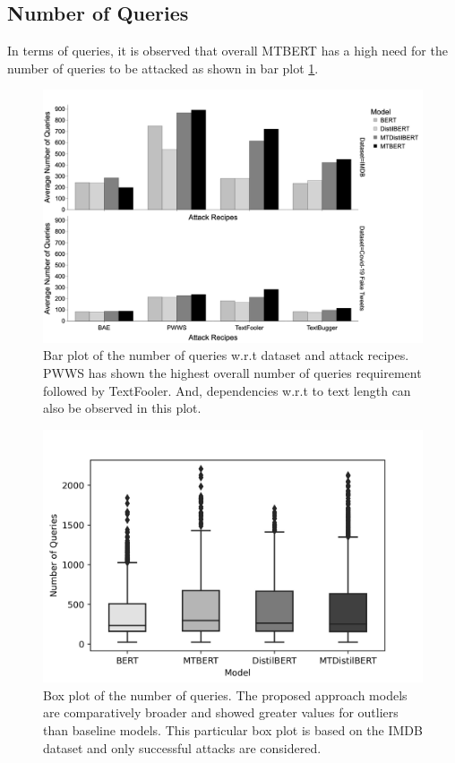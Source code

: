 \documentclass[%
	BCOR=8mm, %
	DIV=12,
	toc=bibliography, %
	toc=listof, %
	oneside, %
	egregdoesnotlikesansseriftitles, %
	]{scrbook}
\begin{document}
\subsection{Number of Queries}
In terms of queries, it is observed that overall MTBERT has a high need for the number of queries to be attacked as shown in bar plot \ref{fig:avgnquebyattackrecipes}.
\begin{figure}[H]
	\centering
    \includegraphics[width=.85\linewidth]{img/AvgNQuebyDataset}
	\caption[Bar plot of the number of queries]{Bar plot of the number of queries w.r.t dataset and attack recipes. PWWS has shown the highest overall number of queries requirement followed by TextFooler.  And, dependencies w.r.t to text length can also be observed in this plot.}
	\label{fig:avgnquebyattackrecipes}
\end{figure}
\begin{figure}[H]
    \centering
    \includegraphics[width=0.70\linewidth]{img/NumQueriesDist_box_IMDB.png}
    \caption[Box plot of the number of queries.]{ Box plot of the number of queries. The proposed approach models are comparatively broader and showed greater values for outliers than baseline models. This particular box plot is based on the IMDB dataset and only successful attacks are considered.}
    \label{fig:numofqueriesdist}
\end{figure}
\end{document}
